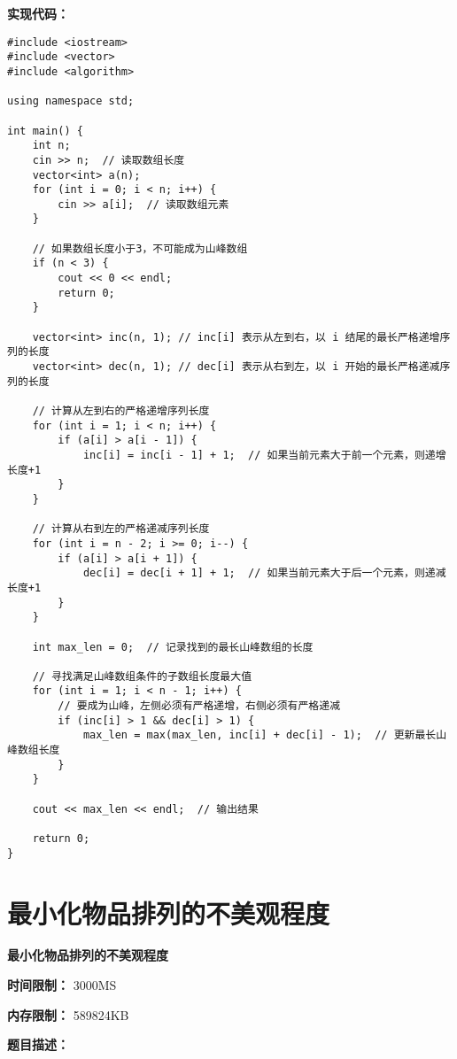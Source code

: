 \documentclass[a4paper]{ctexart}
\begin{document}
\noindent\textbf{实现代码：}
	
\begin{lstlisting}
#include <iostream>
#include <vector>
#include <algorithm>

using namespace std;

int main() {
	int n;
	cin >> n;  // 读取数组长度
	vector<int> a(n);
	for (int i = 0; i < n; i++) {
		cin >> a[i];  // 读取数组元素
	}
	
	// 如果数组长度小于3，不可能成为山峰数组
	if (n < 3) {
		cout << 0 << endl;
		return 0;
	}
	
	vector<int> inc(n, 1); // inc[i] 表示从左到右，以 i 结尾的最长严格递增序列的长度
	vector<int> dec(n, 1); // dec[i] 表示从右到左，以 i 开始的最长严格递减序列的长度
	
	// 计算从左到右的严格递增序列长度
	for (int i = 1; i < n; i++) {
		if (a[i] > a[i - 1]) {
			inc[i] = inc[i - 1] + 1;  // 如果当前元素大于前一个元素，则递增长度+1
		}
	}
	
	// 计算从右到左的严格递减序列长度
	for (int i = n - 2; i >= 0; i--) {
		if (a[i] > a[i + 1]) {
			dec[i] = dec[i + 1] + 1;  // 如果当前元素大于后一个元素，则递减长度+1
		}
	}
	
	int max_len = 0;  // 记录找到的最长山峰数组的长度
	
	// 寻找满足山峰数组条件的子数组长度最大值
	for (int i = 1; i < n - 1; i++) {
		// 要成为山峰，左侧必须有严格递增，右侧必须有严格递减
		if (inc[i] > 1 && dec[i] > 1) {
			max_len = max(max_len, inc[i] + dec[i] - 1);  // 更新最长山峰数组长度
		}
	}
	
	cout << max_len << endl;  // 输出结果
	
	return 0;
}
\end{lstlisting}
	
\newpage
	
\section{最小化物品排列的不美观程度}
	
\begin{center}
	\Large \textbf{最小化物品排列的不美观程度}
\end{center}
	
\noindent\textbf{时间限制：} 3000MS
	
\noindent\textbf{内存限制：} 589824KB
	
\vspace{10pt}
	
\noindent\textbf{题目描述：}
	
\end{document}
